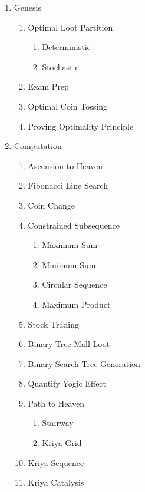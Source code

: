 \begin{enumerate}[noitemsep]
\item Genesis
    \begin{enumerate}
        \item Optimal Loot Partition
         \begin{enumerate}
             \item Deterministic
             \item Stochastic
         \end{enumerate}
        \item Exam Prep
        \item Optimal Coin Tossing
        \item Proving Optimality Principle
    \end{enumerate}
\item Computation
    \begin{enumerate}
        \item Ascension to Heaven
        \item Fibonacci Line Search
        \item Coin Change
        \item Constrained Subsequence
            \begin{enumerate}
                \item Maximum Sum 
                \item Minimum Sum 
                \item Circular Sequence 
                \item Maximum Product 
           \end{enumerate}
           \item Stock Trading 
           \item Binary Tree Mall Loot 
           \item Binary Search Tree Generation
           \item Quantify Yogic Eﬀect
           \item Path to Heaven
            \begin{enumerate}
              \item Stairway
              \item Kriya Grid
           \end{enumerate}
           \item Kriya Sequence
           \item Kriya Catalysis
    \end{enumerate}
\end{enumerate}


